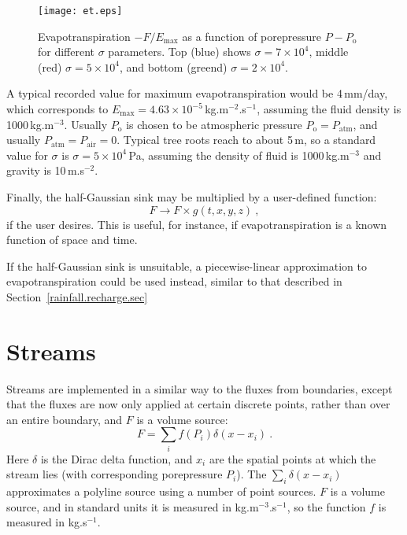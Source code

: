 \documentclass[]{scrreprt}
\begin{document}
\begin{figure}[htb]
\centering
\texttt{[image: et.eps]}
\caption{Evapotranspiration $-F/E_{\mathrm{max}}$ as a function of
  porepressure $P - P_{\mathrm{o}}$ for different $\sigma$ parameters.  Top (blue)
  shows $\sigma=7\times 10^{4}$, middle (red) $\sigma=5\times 10^{4}$,
  and bottom (greend) $\sigma=2\times 10^{4}$.}
\label{et.fig}
\end{figure}


A typical recorded value for maximum evapotranspiration would be
4\,mm/day, which corresponds to $E_{\mathrm{max}} = 4.63\times
10^{-5}$\,kg.m$^{-2}$.s$^{-1}$, assuming the fluid density is
1000\,kg.m$^{-3}$.  Usually $P_{\mathrm{o}}$ is chosen to be atmospheric
pressure $P_{\mathrm{o}} = P_{\mathrm{atm}}$, and usually $P_{\mathrm{atm}} =
P_{\mathrm{air}} = 0$.  Typical tree roots reach to
about 5\,m, so a standard value for $\sigma$ is $\sigma = 5\times
10^{4}$\,Pa, assuming the density of fluid
is 1000\,kg.m$^{-3}$ and gravity is 10\,m.s$^{-2}$.

Finally, the half-Gaussian sink may be multiplied by a
user-defined function:
\begin{equation}
F \rightarrow F\times g(t, x, y, z) \ ,
\end{equation}
if the user desires.  This is useful, for instance, if
evapotranspiration is a known function of space and time.


If the half-Gaussian sink is unsuitable, a piecewise-linear
approximation to evapotranspiration could be used instead, similar to
that described in Section~\ref{rainfall.recharge.sec}


\section{Streams}

Streams are implemented in a similar way to the fluxes from
boundaries, except that the fluxes are now only
applied at certain discrete points, rather than over an entire
boundary, and $F$ is a volume source:
\begin{equation}
F = \sum_{i}f(P_{i})\delta(x - x_{i}) \ .
\label{source.stream.eqn}
\end{equation}
Here $\delta$ is the Dirac delta function, and $x_{i}$ are the spatial
points at which the stream lies (with corresponding porepressure
$P_{i}$).  The $\sum_{i}\delta(x-x_{i})$ approximates a polyline source
using a number of point sources.  $F$ is a volume source, and in
standard units it is measured in kg.m$^{-3}$.s$^{-1}$, so the function
$f$ is measured in kg.s$^{-1}$.
\end{document}
